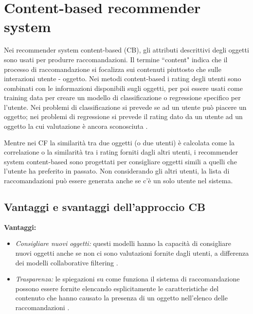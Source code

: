 \section{Content-based recommender system}
Nei recommender system content-based (CB), gli attributi descrittivi degli oggetti sono usati per produrre raccomandazioni. Il termine ``content" indica che il processo di raccomandazione si focalizza sui contenuti piuttosto che sulle interazioni utente - oggetto. Nei metodi content-based i rating degli utenti sono combinati con le informazioni disponibili sugli oggetti, per poi essere usati come training data per creare un modello di classificazione o regressione  specifico per l'utente. Nei problemi di classificazione si prevede se ad un utente può piacere un oggetto; nei problemi di regressione si prevede il rating dato da un utente ad un oggetto la cui valutazione è ancora sconosciuta \cite{recsys-book}.

Mentre nei CF la similarità tra due oggetti (o due utenti) è calcolata come la correlazione o la similarità tra i rating forniti dagli altri utenti, i recommender system content-based sono progettati per consigliare oggetti simili a quelli che l'utente ha preferito in passato. Non considerando gli altri utenti, la lista di raccomandazioni può essere generata anche se c'è un solo utente nel sistema.

\subsection{Vantaggi e svantaggi dell'approccio CB}
\textbf{Vantaggi:}
\begin{itemize}
 \item \textit{Consigliare nuovi oggetti:} questi modelli hanno la capacità di consigliare nuovi oggetti anche se non ci sono valutazioni fornite dagli utenti, a differenza dei modelli collaborative filtering \cite{recsys-principle-methods-evaluation}.
 
 \item \textit{Trasparenza:} le spiegazioni su come funziona il sistema di raccomandazione possono essere fornite elencando esplicitamente le caratteristiche del contenuto che hanno causato la presenza di un oggetto nell'elenco delle raccomandazioni \cite{transparency}. 
\end{itemize}

